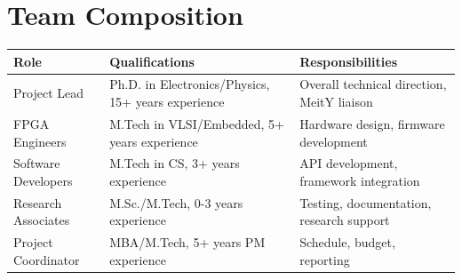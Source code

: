 \documentclass[12pt,a4paper]{article}
\theoremstyle{definition}
\begin{document}
\section{Team Composition}
\label{app:team}

\begin{table}[htbp]
\centering
\begin{tabular}{@{}p{3cm}p{4cm}p{5cm}@{}}
\toprule
\textbf{Role} & \textbf{Qualifications} & \textbf{Responsibilities} \\
\midrule
Project Lead & Ph.D. in Electronics/Physics, 15+ years experience & Overall technical direction, MeitY liaison \\
FPGA Engineers & M.Tech in VLSI/Embedded, 5+ years experience & Hardware design, firmware development \\
Software Developers & M.Tech in CS, 3+ years experience & API development, framework integration \\
Research Associates & M.Sc./M.Tech, 0-3 years experience & Testing, documentation, research support \\
Project Coordinator & MBA/M.Tech, 5+ years PM experience & Schedule, budget, reporting \\
\bottomrule
\end{tabular}
\end{table}
\end{document}
